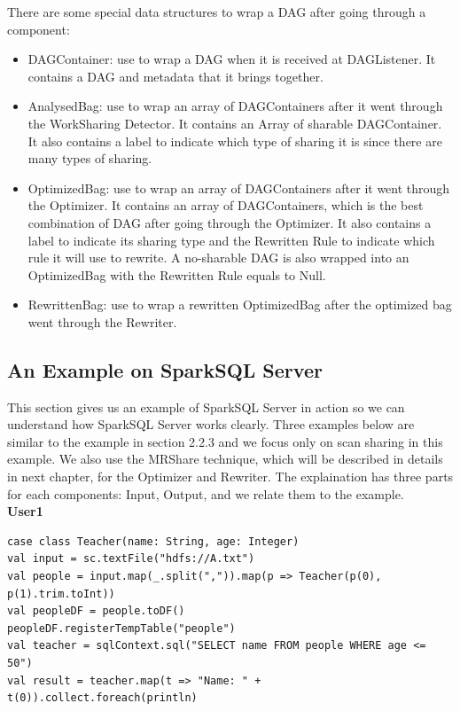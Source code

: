 There are some special data structures to wrap a DAG after going through a component:\\
\begin{itemize}
\item DAGContainer: use to wrap a DAG when it is received at DAGListener. It contains a DAG and metadata that it brings together.
\item AnalysedBag: use to wrap an array of DAGContainers after it went through the WorkSharing Detector. It contains an Array of sharable DAGContainer. It also contains a label to indicate which type of sharing it is since there are many types of sharing.
\item OptimizedBag: use to wrap an array of DAGContainers after it went through the Optimizer. It  contains an array of DAGContainers, which is the best combination of DAG after going through the Optimizer. It also contains a label to indicate its sharing type and the Rewritten Rule to indicate which rule it will use to rewrite. A no-sharable DAG is also wrapped into an OptimizedBag with the Rewritten Rule equals to Null.
\item RewrittenBag: use to wrap a rewritten OptimizedBag after the optimized bag went through the Rewriter.
\end{itemize}


\subsection{An Example on SparkSQL Server}

This section gives us an example of SparkSQL Server in action so we can understand how SparkSQL Server works clearly.
Three examples below are similar to the example in section 2.2.3 and we focus only on scan sharing in this example. We also use the MRShare technique, which will be described in details in next chapter, for the Optimizer and Rewriter. The explaination has three parts for each components: Input, Output, and we relate them to the example.\\
\textbf{User1}

\begin{lstlisting}
case class Teacher(name: String, age: Integer)
val input = sc.textFile("hdfs://A.txt")
val people = input.map(_.split(",")).map(p => Teacher(p(0), p(1).trim.toInt))
val peopleDF = people.toDF()
peopleDF.registerTempTable("people")
val teacher = sqlContext.sql("SELECT name FROM people WHERE age <= 50")
val result = teacher.map(t => "Name: " + t(0)).collect.foreach(println)
\end{lstlisting}

